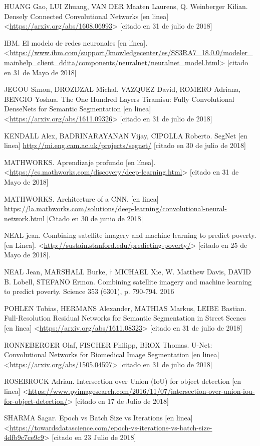 HUANG Gao, LUI Zhuang, VAN DER Maaten Laurens, Q. Weinberger Kilian. Densely Connected Convolutional Networks [en linea] <\url{https://arxiv.org/abs/1608.06993}> [citado en 31 de julio de 2018]

IBM. El modelo de redes neuronales [en línea]. <\url{https://www.ibm.com/support/knowledgecenter/es/SS3RA7_18.0.0/modeler_mainhelp_client_ddita/components/neuralnet/neuralnet_model.html}> [citado en 31 de Mayo de 2018]

JEGOU Simon, DROZDZAL Michal, VAZQUEZ David, ROMERO Adriana, BENGIO Yoshua. The One Hundred Layers Tiramisu: Fully Convolutional DenseNets for Semantic Segmentation [en linea] <\url{https://arxiv.org/abs/1611.09326}> [citado en 31 de julio de 2018]

KENDALL Alex, BADRINARAYANAN Vijay, CIPOLLA Roberto. SegNet [en linea] \url{http://mi.eng.cam.ac.uk/projects/segnet/} [citado en 30 de julio de 2018]

MATHWORKS. Aprendizaje profundo [en línea]. <\url{https://es.mathworks.com/discovery/deep-learning.html}> [citado en 31 de Mayo de 2018]

MATHWORKS. Architecture of a CNN. [en linea] \url{https://la.mathworks.com/solutions/deep-learning/convolutional-neural-network.html} [Citado en 30 de junio de 2018]

NEAL jean. Combining satellite imagery and machine learning to predict poverty. [en Linea]. <\url{http://sustain.stanford.edu/predicting-poverty/}> [citado en 25 de Mayo de 2018].

NEAL Jean, MARSHALL Burke, † MICHAEL Xie, W. Matthew Davis, DAVID B. Lobell, STEFANO Ermon. Combining satellite imagery and machine learning to predict poverty. Science 353 (6301), p. 790-794. 2016

POHLEN Tobias, HERMANS Alexander, MATHIAS Markus, LEIBE Bastian. Full-Resolution Residual Networks for Semantic Segmentation in Street Scenes [en linea] <\url{https://arxiv.org/abs/1611.08323}> [citado en 31 de julio de 2018]

RONNEBERGER Olaf, FISCHER Philipp, BROX Thomas. U-Net: Convolutional Networks for Biomedical Image Segmentation [en linea] <\url{https://arxiv.org/abs/1505.04597}> [citado en 31 de julio de 2018]

ROSEBROCK Adrian. Intersection over Union (IoU) for object detection [en linea] <\url{https://www.pyimagesearch.com/2016/11/07/intersection-over-union-iou-for-object-detection/}> [citado en 17 de Julio de 2018]

SHARMA Sagar. Epoch vs Batch Size vs Iterations [en linea] <\url{https://towardsdatascience.com/epoch-vs-iterations-vs-batch-size-4dfb9c7ce9c9}> [citado en 23 Julio de 2018]

